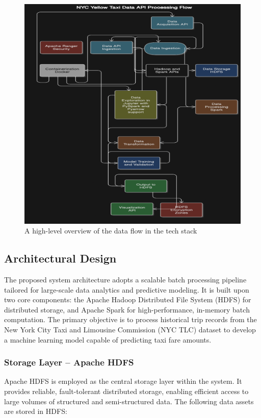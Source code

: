 \documentclass[conference]{IEEEtran}
\begin{document}
\begin{figure}
  \includegraphics[width=\linewidth]{data-flow-overview.png}
  \centering
  \caption{A high-level overview of the data flow in the tech stack}
\end{figure}

\subsection{Architectural Design}
The proposed system architecture adopts a scalable batch processing pipeline tailored for large-scale data analytics and predictive modeling. It is built upon two core components: the Apache Hadoop Distributed File System (HDFS) for distributed storage, and Apache Spark for high-performance, in-memory batch computation. The primary objective is to process historical trip records from the New York City Taxi and Limousine Commission (NYC TLC) dataset to develop a machine learning model capable of predicting taxi fare amounts.

\subsubsection{Storage Layer – Apache HDFS}
Apache HDFS is employed as the central storage layer within the system. It provides reliable, fault-tolerant distributed storage, enabling efficient access to large volumes of structured and semi-structured data. The following data assets are stored in HDFS:
\end{document}
